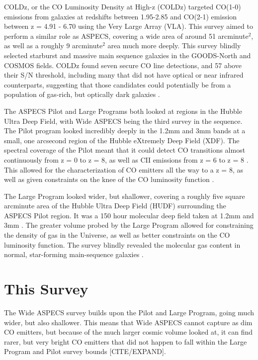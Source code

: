 COLDz, or the CO Luminosity Density at High-z (COLDz) targeted CO(1-0) emissions from galaxies at redshifts between 1.95-2.85 and CO(2-1) emission between z = 4.91 - 6.70 using the Very Large Array (VLA)\cite{pavesi2018co}. This survey aimed to perform a similar role as ASPECS, covering a wide area of around 51 arcminute$^2$, as well as a roughly 9 arcminute$^2$ area much more deeply. This survey blindly selected starburst and massive main sequence galaxies in the GOODS-North and COSMOS fields. COLDz found seven secure CO line detections, and 57 above their S/N threshold, including many that did not have optical or near infrared counterparts, suggesting that those candidates could potentially be from a population of gas-rich, but optically dark galaxies \cite{pavesi2018co}.

The ASPECS Pilot and Large Programs both looked at regions in the Hubble Ultra Deep Field, with Wide ASPECS being the third survey in the sequence. The Pilot program looked incredibly deeply in the 1.2mm and 3mm bands at a small, one arcsecond region of the Hubble eXtremely Deep Field (XDF). The spectral coverage of the Pilot meant that it could detect CO transitions almost continuously from z = 0 to z = 8, as well as CII emissions from z = 6 to z = 8 \cite{walter2016alma}. This allowed for the characterization of CO emitters all the way to a z = 8, as well as given constraints on the knee of the CO luminosity function \cite{walter2016alma}. 

The Large Program looked wider, but shallower, covering a roughly five square arcminute area of the Hubble Ultra Deep Field (HUDF) surrounding the ASPECS Pilot region. It was a 150 hour molecular deep field taken at 1.2mm and 3mm \cite{decarli2019alma}. The greater volume probed by the Large Program allowed for constraining the density of gas in the Universe, as well as better constraints on the CO luminosity function. The survey blindly revealed the molecular gas content in normal, star-forming main-sequence galaxies \cite{decarli2019alma}. 

\section{This Survey}

The Wide ASPECS survey builds upon the Pilot and Large Program, going much wider, but also shallower. This means that Wide ASPECS cannot capture as dim CO emitters, but because of the much larger cosmic volume looked at, it can find rarer, but very bright CO emitters that did not happen to fall within the Large Program and Pilot survey bounds [CITE/EXPAND].

